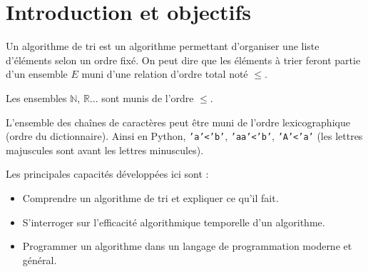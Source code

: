 



% 
%



\section{Introduction et objectifs}

\begin{obj}

Un algorithme de tri est un algorithme permettant d'organiser une liste d'éléments selon un ordre fixé.  On peut dire que les éléments à trier feront partie d'un ensemble $E$ muni d'une relation d'ordre total noté $\leq$.

Les ensembles $\mathbb{N}$, $\mathbb{R}$... sont munis de l'ordre $\leq$. 

L'ensemble des chaînes de caractères peut être muni de l'ordre lexicographique (ordre du dictionnaire). Ainsi en Python, \texttt{'a'<'b'}, \texttt{'aa'<'b'}, \texttt{'A'<'a'} (les lettres majuscules sont avant les lettres minuscules).

Les principales capacités développées ici sont :
\begin{itemize}
\item Comprendre un algorithme de tri et expliquer ce qu'il fait.
\item S'interroger sur l'efficacité algorithmique temporelle d'un algorithme.
\item Programmer un algorithme dans un langage de programmation moderne et général.
\end{itemize}

\end{obj}




